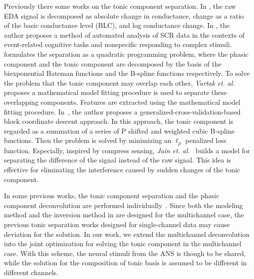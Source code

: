 \documentclass[10pt,conference]{ieeeconf}
\begin{document}
Previously there some works on the tonic component separation. In \cite{van1967skin}, the raw EDA signal is decomposed as absolute change in conductance, change as a ratio of the basic conductance level (BLC), and log conductance change. In \cite{green2014development}, the author proposes a method of automated analysis of SCR data in the contexts of event-related cognitive tasks and nonspecific responding to complex stimuli. \cite{greco2014electrodermal} formulates the separation as a quadratic programming problem, where the phasic component and the tonic component are decomposed by the basis of the biexponential Bateman functions and the B-spline functions respectively. To solve the problem that the tonic component may overlap each other, \textit{Vartak et. al.} proposes a mathematical model fitting procedure is used to separate these overlapping components. Features are extracted using the mathematical model fitting procedure. In~\cite{amin2019tonic}, the author proposes a generalized-cross-validation-based block coordinate descent approach. In this approach, the tonic component is regarded as a summation of a series of P shifted and weighted cubic B-spline functions. Then the problem is solved by minimizing an $\ell_p$ penalized loss function. Especially, inspired by compress sensing, \textit{Jain et. al.}~\cite{jain2016compressed} builds a model for separating the difference of the signal instead of the raw signal. This idea is effective for eliminating the interference caused by sudden changes of the tonic component.

In some previous works, the tonic component separation and the phasic component deconvolution are performed individually~\cite{greco2014electrodermal,amin2019robust}. Since both the modeling method and the inversion method in \cite{amin2019robust} are designed for the multichannel case, the previous tonic separation works designed for single-channel data may cause deviation for the solution. In our work, we extend the multichannel deconvolution into the joint optimization for solving the tonic component in the multichannel case. With this scheme, the neural stimuli from the ANS is though to be shared, while the solution for the composition of tonic basis is assumed to be different in different channels.



\end{document}
